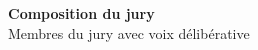 \documentclass[12pt,a4paper, twoside, headings=small]{book}
\begin{document}
\begin{titlepage}
        \bigskip

        \flushleft
        \normalsize {\color{Prune} \textbf{Composition du jury}}\\
        \small {\color{Prune} Membres du jury avec voix délibérative}\\

        \vspace{2mm}
        \scriptsize


\end{titlepage}
\end{document}
